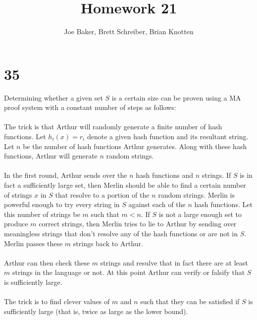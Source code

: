 \documentclass[letterpaper,notitlepage,twoside]{article}
\begin{document}
\title{Homework 21}
\author{Joe Baker, Brett Schreiber, Brian Knotten}
\maketitle

\section*{35}

Determining whether a given set $S$ is a certain size can be proven using a MA proof system with a constant number of steps as follows: \\\\

The trick is that Arthur will randomly generate a finite number of hash functions. Let $h_i(x) = r_i$ denote a given hash function and its resultant string. Let $n$ be the number of hash functions Arthur generates. Along with these hash functions, Arthur will generate $n$ random strings. \\\\

In the first round, Arthur sends over the $n$ hash functions and $n$ strings. If $S$ is in fact a sufficiently large set, then Merlin should be able to find a certain number of strings $x$ in $S$ that resolve to a portion of the $n$ random strings. Merlin is powerful enough to try every string in $S$ against each of the $n$ hash functions. Let this number of strings be $m$ such that $m < n$. If $S$ is not a large enough set to produce $m$ correct strings, then Merlin tries to lie to Arthur by sending over meaningless strings that don't resolve any of the hash functions or are not in $S$. Merlin passes these $m$ strings back to Arthur. \\\\

Arthur can then check these $m$ strings and resulve that in fact there are at least $m$ strings in the language or not. At this point Arthur can verify or falsify that $S$ is sufficiently large. \\\\

The trick is to find clever values of $m$ and $n$ such that they can be satisfied if $S$ is sufficiently large (that is, twice as large as the lower bound). \\\\
\end{document}
